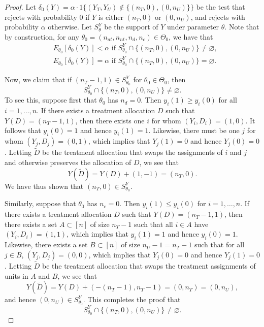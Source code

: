 \documentclass[12pt,reqno]{amsart}
\theoremstyle{theorem}
\theoremstyle{definition}
\let\emptyset\varnothing
\newcommand{\0}{\mathbf{0}}
\newcommand{\1}{\mathbf{1}}
\begin{document}
\propunbiasedexists*
\begin{proof}
Let $\delta_0(Y) = \alpha \cdot 1\{ (Y_T,Y_U) \not\in \{ (n_T,0), (0,n_U) \} \} $ be the test that rejects with probability $0$ if $Y$ is either $(n_T,0)$ or $(0,n_U)$, and rejects with probability $\alpha$ otherwise. Let $S^Y_\theta$ be the support of $Y$ under parameter $\theta$. Note that by construction, for any $\theta_0 = (n_{at},n_{nt}, n_d, n_c) \in \Theta_0$, we have that 
\begin{align*}
& E_{\theta_0 }[\delta_0(Y)]  < \alpha \text{ if } S^Y_{\theta_0} \cap  \{ (n_T,0), (0,n_U) \} \neq \emptyset, \\
& E_{\theta_0 }[\delta_0(Y)]  =  \alpha \text{ if } S^Y_{\theta_0} \cap  \{ (n_T,0), (0,n_U) \}  = \emptyset .
\end{align*}

Now, we claim that if $(n_T -1 , 1) \in S_{\theta_0}^Y$ for $\theta_0 \in \Theta_0$, then
\[
S^Y_{\theta_0} \cap  \{ (n_T,0), (0,n_U) \}  \neq \emptyset .
\]
To see this, suppose first that $\theta_0$ has $n_d = 0$. Then $y_i(1) \geq y_i(0)$ for all $i= 1,\ldots,n$. If there exists a treatment allocation $D$ such that $Y(D) = (n_T-1,1)$, then there exists one $i$ for whom $(Y_i,D_i) = (1,0)$. It follows that $y_i(0) = 1$ and hence $y_i(1)=1$. Likewise, there must be one $j$ for whom $(Y_j,D_j) = (0,1)$, which implies that $Y_j(1) = 0$ and hence $Y_j(0) = 0$. Letting $\tilde{D}$ be the treatment allocation that swaps the assignments of $i$ and $j$ and otherwise preserves the allocation of $D$, we see that
\[
Y(\tilde{D}) = Y(D) + (1,-1) = (n_T,0).
\]
We have thus shown that $(n_T,0) \in S^Y_{\theta_0}$.

Similarly, suppose that $\theta_0$ has $n_c = 0$. Then $y_i(1) \leq y_i(0)$ for $i=1,\ldots,n$. If there exists a treatment allocation $D$ such that $Y(D) = (n_T-1,1)$, then there exists a set $A \subset [n]$ of size $n_T-1$ such that all $i \in A$ have $(Y_i,D_i) = (1,1)$, which implies that $y_i(1) = 1$ and hence $y_i(0) = 1$. Likewise, there exists a set $B \subset [n]$ of size $n_U - 1 = n_T - 1$ such that for all $j \in B$, $(Y_j,D_j) = (0,0)$, which implies that $Y_j(0) = 0$ and hence $Y_j(1) = 0$. Letting $\tilde{D}$ be the treatment allocation that swaps the treatment assignments of units in $A$ and $B$, we see that
\[
Y(\tilde{D}) = Y(D) + (-(n_T-1),n_T-1) = (0,n_T) = (0,n_U),
\]
and hence $(0,n_U) \in S^Y_{\theta_0}$. This completes the proof that
\[
S^Y_{\theta_0} \cap  \{ (n_T,0), (0,n_U) \}  \neq \emptyset .
\]


\end{proof}
\end{document}
